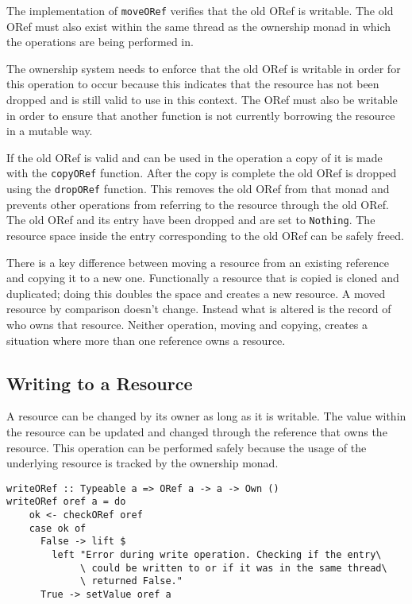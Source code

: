 \documentclass[onehalf,11pt]{beavtex}
\begin{document}
The implementation of \texttt{moveORef} verifies that the old ORef is writable.
The old ORef must also exist within the same thread as the ownership monad in
which the operations are being performed in.

The ownership system needs to enforce that the old ORef is
writable in order for this operation to occur because this indicates that the
resource has not been dropped and is still valid to use in this context.
The ORef must also be writable in order to ensure that another function
is not currently borrowing the resource in a mutable way.

If the old ORef is valid and can be used in the operation a copy of it is made
with the \texttt{copyORef} function.  After the copy is complete the old ORef
is dropped using the \texttt{dropORef} function. This removes the old ORef from
that monad and prevents other operations from referring to the resource through
the old ORef.
The old ORef and its entry have been dropped and are set to \texttt{Nothing}.
The resource space inside the entry corresponding to the old ORef can be safely
freed.

There is a key difference between moving a resource from an existing reference
and copying it to a new one.  Functionally a resource that is copied is cloned
and duplicated; doing this doubles the space and creates a new resource.
A moved resource by comparison doesn't change.  Instead what is altered is the
record of who owns that resource.  Neither operation, moving and copying,
creates a situation where more than one reference owns a resource.

\subsection{Writing to a Resource}

A resource can be changed by its owner as long as it is writable.
The value within the resource can be updated and changed through the reference
that owns the resource. This operation can be performed safely because the usage
of the underlying resource is tracked by the ownership monad.

\begin{verbatim}
writeORef :: Typeable a => ORef a -> a -> Own ()
writeORef oref a = do
    ok <- checkORef oref
    case ok of
      False -> lift $
        left "Error during write operation. Checking if the entry\
             \ could be written to or if it was in the same thread\
             \ returned False."
      True -> setValue oref a
\end{verbatim}
\end{document}
